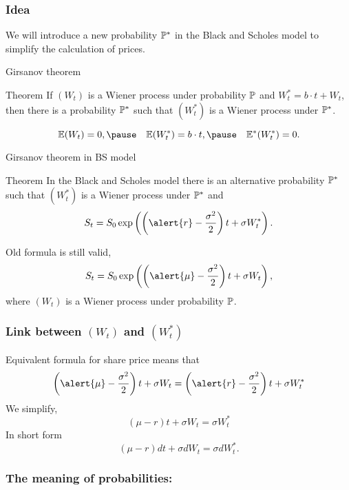 \begin{frame}
  \frametitle{Idea}
  We will introduce a \alert{new probability} $\P^*$ 
  in the Black and Scholes model to simplify the calculation of prices. 
\end{frame}


\begin{frame}{Girsanov theorem}

  \begin{block}{Theorem \formalduck}
    If $(W_t)$ is a Wiener process under probability $\P$ and $W_t^* = b\cdot t + W_t$,
    then there is a probability $\P^*$ such that $(W_t^*)$ is a Wiener process under $\P^*$.
  \end{block}

  \pause
  \[
  \E(W_t) = 0, \pause \quad \E(W_t^*) = b\cdot t, \pause \quad \E^*(W_t^*) = 0.
  \]
        
\end{frame}

\begin{frame}{Girsanov theorem in BS model}

  \begin{block}{Theorem \formalduck}
    In the Black and Scholes model there is an alternative probability $\P^*$ such that
    $(W_t^*)$ is a Wiener process under $\P^*$ and 
    \[
      S_t = S_0 \exp  \left(  \left( \alert{r} - \frac{\sigma^2}{2}\right)t + \sigma W^*_t \right).  
    \]
  \end{block}
  \pause 
  Old formula is still valid,
  \[
    S_t = S_0 \exp  \left(  \left( \alert{\mu} - \frac{\sigma^2}{2}\right)t + \sigma W_t \right), 
  \]
  where $(W_t)$ is a Wiener process under probability $\P$.

\end{frame}

\begin{frame}
  \frametitle{Link between $(W_t)$ and $(W^*_t)$}

  Equivalent formula for share price means that 
  \[
    \left( \alert{\mu} - \frac{\sigma^2}{2}\right)t + \sigma W_t =  \left( \alert{r} - \frac{\sigma^2}{2}\right)t + \sigma W_t^*
  \]
  \pause
  We simplify, 
  \[
    (\mu - r) t  + \sigma W_t = \sigma W_t^* 
  \]
  \pause 
  In \alert{short} form 
  \[
    (\mu - r)dt + \sigma dW_t = \sigma dW_t^*.
  \]

\end{frame}

\begin{frame}
  \frametitle{The meaning of probabilities:}
  \begin{itemize}
  \end{itemize}



\end{frame}

